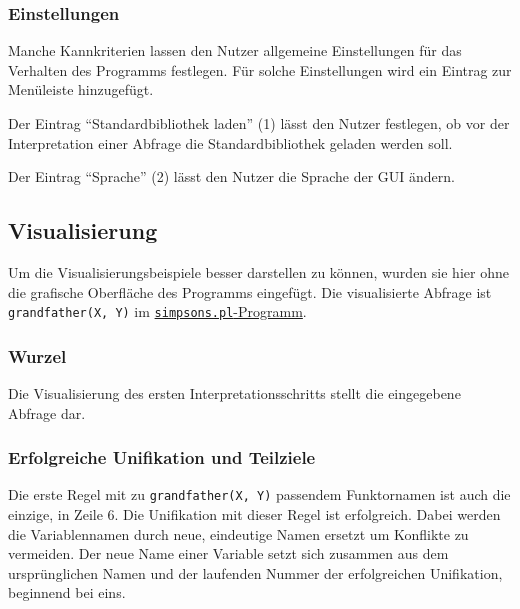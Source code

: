 \documentclass[parskip=full,11pt,twoside]{scrartcl}
\begin{document}
\subsubsection{Einstellungen}

Manche Kannkriterien lassen den Nutzer allgemeine Einstellungen für das Verhalten des Programms festlegen.
Für solche Einstellungen wird ein Eintrag zur Menüleiste hinzugefügt.

\begin{minipage}{\linewidth}
\end{minipage}

Der Eintrag \enquote{Standardbibliothek laden} (1) lässt den Nutzer festlegen, ob vor der Interpretation einer Abfrage die Standardbibliothek geladen werden soll.

Der Eintrag \enquote{Sprache} (2) lässt den Nutzer die Sprache der GUI ändern.

\subsection{Visualisierung}

Um die Visualisierungsbeispiele besser darstellen zu können, wurden sie hier ohne die grafische Oberfläche des Programms eingefügt.
Die visualisierte Abfrage ist \texttt{grandfather(X, Y)} im \hyperref[appendix:simpsons]{\texttt{simpsons.pl}-Programm}.

\subsubsection{Wurzel}

\begin{minipage}{\linewidth}
\end{minipage}

Die Visualisierung des ersten Interpretationsschritts stellt die eingegebene Abfrage dar.

\subsubsection{Erfolgreiche Unifikation und Teilziele}

Die erste Regel mit zu \texttt{grandfather(X, Y)} passendem Funktornamen ist auch die einzige, in Zeile 6.
Die Unifikation mit dieser Regel ist erfolgreich.
Dabei werden die Variablennamen durch neue, eindeutige Namen ersetzt um Konflikte zu vermeiden.
Der neue Name einer Variable setzt sich zusammen aus dem ursprünglichen Namen und der laufenden Nummer der erfolgreichen Unifikation, beginnend bei eins.
\end{document}
